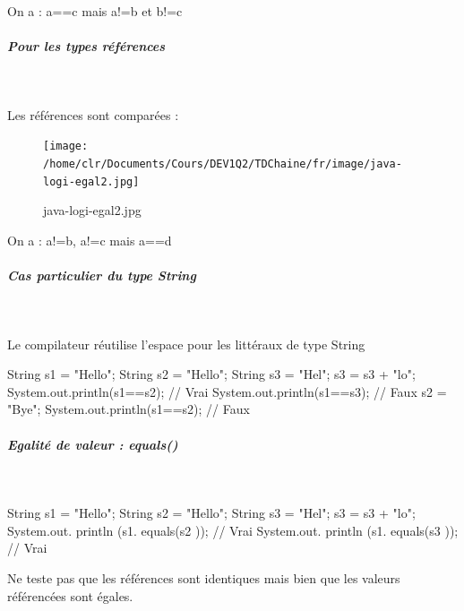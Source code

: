 \documentclass[11pt,a4paper]{article}
\begin{document}
        On a : a==c mais a!=b et b!=c
      
            \par
        
			
		\subparagraph{Pour les types r\'ef\'erences} 
		
					\textcolor{white}{.} \par
				
		    Les r\'ef\'erences sont compar\'ees :
		  
            \par
        \begin{figure}[hbt]
				    \begin{center}
					\texttt{[image: /home/clr/Documents/Cours/DEV1Q2/TDChaine/fr/image/java-logi-egal2.jpg]}
						\end{center}
                
                    \caption[java-logi-egal2.jpg]{java-logi-egal2.jpg}
                \end{figure}
                    
            \par
        
        On a : a!=b, a!=c mais a==d
      
            \par
        
			
		\subparagraph{Cas particulier du type String} 
		
					\textcolor{white}{.} \par
				
        Le compilateur r\'eutilise l'espace pour les litt\'eraux de type String
      
            \par
        \begin{Java}
String s1 = "Hello";
String s2 = "Hello";
String s3 = "Hel";
s3 = s3 + "lo";
System.out.println(s1==s2); // Vrai
System.out.println(s1==s3); // Faux
s2 = "Bye";
System.out.println(s1==s2); // Faux
      \end{Java}
			
		\subparagraph{Egalit\'e de valeur : equals()} 
		
					\textcolor{white}{.} \par
				
            \par
        \begin{Java}
String s1 = "Hello";
String s2 = "Hello";
String s3 = "Hel";
s3 = s3 + "lo";
System.out. println (s1. equals(s2 )); // Vrai
System.out. println (s1. equals(s3 )); // Vrai
      \end{Java}
      Ne teste pas que les r\'ef\'erences sont identiques mais bien que les valeurs r\'ef\'erenc\'ees sont \'egales.
      
\end{document}
